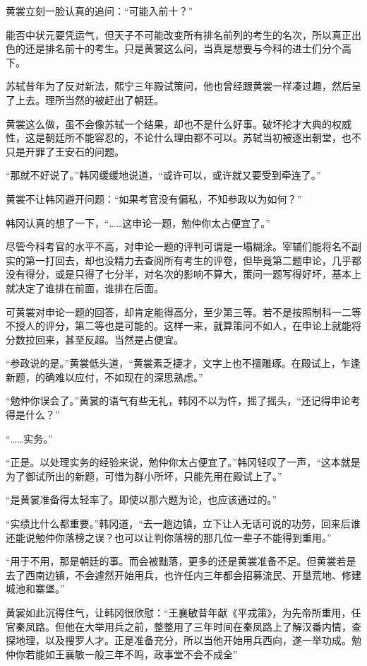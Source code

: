 黄裳立刻一脸认真的追问：“可能入前十？”

能否中状元要凭运气，但天子不可能改变所有排名前列的考生的名次，所以真正出色的还是排名前十的考生。只是黄裳这么问，当真是想要与今科的进士们分个高下。

苏轼昔年为了反对新法，熙宁三年殿试策问，他也曾经跟黄裳一样凑过趣，然后呈了上去。理所当然的被赶出了朝廷。

黄裳这么做，虽不会像苏轼一个结果，却也不是什么好事。破坏抡才大典的权威性，这是朝廷所不能容忍的，不论什么理由都不可以。苏轼当初被逐出朝堂，也不只是开罪了王安石的问题。

“那就不好说了。”韩冈缓缓地说道，“或许可以，或许就又要受到牵连了。”

黄裳不让韩冈避开问题：“如果考官没有偏私，不知参政以为如何？”

韩冈认真的想了一下，“……这申论一题，勉仲你太占便宜了。”

尽管今科考官的水平不高，对申论一题的评判可谓是一塌糊涂。宰辅们能将名不副实的第一打回去，却也没精力去查阅所有考生的评卷，但毕竟第二题申论，几乎都没有得分，或是只得了七分半，对名次的影响不算大，策问一题写得好坏，基本上就决定了谁排在前面，谁排在后面。

可黄裳对申论一题的回答，却肯定能得高分，至少第三等。若不是按照制科一二等不授人的评分，第二等也是可能的。这样一来，就算策问不如人，在申论上就能将分数拉回来，甚至反超。当然是占便宜。

“参政说的是。”黄裳低头道，“黄裳素乏捷才，文字上也不擅雕琢。在殿试上，乍逢新题，的确难以应付，不如现在的深思熟虑。”

“勉仲你误会了。”黄裳的语气有些无礼，韩冈不以为忤，摇了摇头，“还记得申论考得是什么？”

“……实务。”

“正是。以处理实务的经验来说，勉仲你太占便宜了。”韩冈轻叹了一声，“这本就是为了御试所出的新题，可惜为群小所坏，只能先用在殿试上了。”

“是黄裳准备得太轻率了。即使以那六题为论，也应该通过的。”

“实绩比什么都重要。”韩冈道，“去一趟边镇，立下让人无话可说的功劳，回来后谁还能说勉仲你落榜之误？也可以让判你落榜的那几位一辈子不能得到重用。”

“用于不用，那是朝廷的事。而会被黜落，更多的还是黄裳准备不足。但黄裳若是去了西南边镇，不会遽然开始用兵，也许任内三年都会招募流民、开垦荒地、修建城池和寨堡。”

黄裳如此沉得住气，让韩冈很欣慰：“王襄敏昔年献《平戎策》，为先帝所重用，任官秦凤路。但他在大举用兵之前，整整用了三年时间在秦凤路上了解汉番内情，查探地理，以及搜罗人才。正是准备充分，所以当他开始用兵西向，遂一举功成。勉仲你若能如王襄敏一般三年不鸣，政事堂不会不成全”

